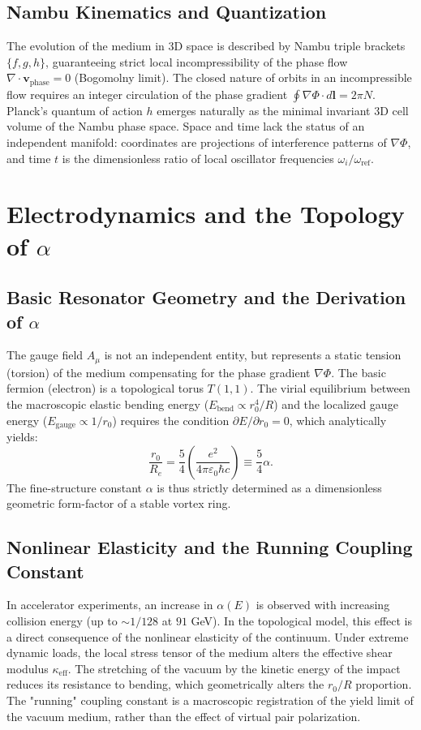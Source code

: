 \documentclass[12pt,a4paper]{article}
\begin{document}
\subsection{Nambu Kinematics and Quantization}
The evolution of the medium in 3D space is described by Nambu triple brackets $\{f, g, h\}$, guaranteeing strict local incompressibility of the phase flow $\nabla \cdot \mathbf{v}_{\text{phase}} = 0$ (Bogomolny limit). The closed nature of orbits in an incompressible flow requires an integer circulation of the phase gradient $\oint \nabla \Phi \cdot d\mathbf{l} = 2\pi N$. Planck's quantum of action $h$ emerges naturally as the minimal invariant 3D cell volume of the Nambu phase space. Space and time lack the status of an independent manifold: coordinates are projections of interference patterns of $\nabla \Phi$, and time $t$ is the dimensionless ratio of local oscillator frequencies $\omega_i / \omega_{\text{ref}}$.

\section{Electrodynamics and the Topology of $\alpha$}

\subsection{Basic Resonator Geometry and the Derivation of $\alpha$}
The gauge field $A_\mu$ is not an independent entity, but represents a static tension (torsion) of the medium compensating for the phase gradient $\nabla \Phi$. The basic fermion (electron) is a topological torus $T(1,1)$. The virial equilibrium between the macroscopic elastic bending energy ($E_{\text{bend}} \propto r_0^4/R$) and the localized gauge energy ($E_{\text{gauge}} \propto 1/r_0$) requires the condition $\partial E / \partial r_0 = 0$, which analytically yields:
\begin{equation}
\frac{r_0}{R_e} = \frac{5}{4} \left( \frac{e^2}{4\pi\varepsilon_0 \hbar c} \right) \equiv \frac{5}{4} \alpha.
\end{equation}
The fine-structure constant $\alpha$ is thus strictly determined as a dimensionless geometric form-factor of a stable vortex ring.

\subsection{Nonlinear Elasticity and the Running Coupling Constant}
In accelerator experiments, an increase in $\alpha(E)$ is observed with increasing collision energy (up to $\sim 1/128$ at $91$ GeV). In the topological model, this effect is a direct consequence of the nonlinear elasticity of the continuum. Under extreme dynamic loads, the local stress tensor of the medium alters the effective shear modulus $\kappa_{\text{eff}}$. The stretching of the vacuum by the kinetic energy of the impact reduces its resistance to bending, which geometrically alters the $r_0/R$ proportion. The "running" coupling constant is a macroscopic registration of the yield limit of the vacuum medium, rather than the effect of virtual pair polarization.
\end{document}
